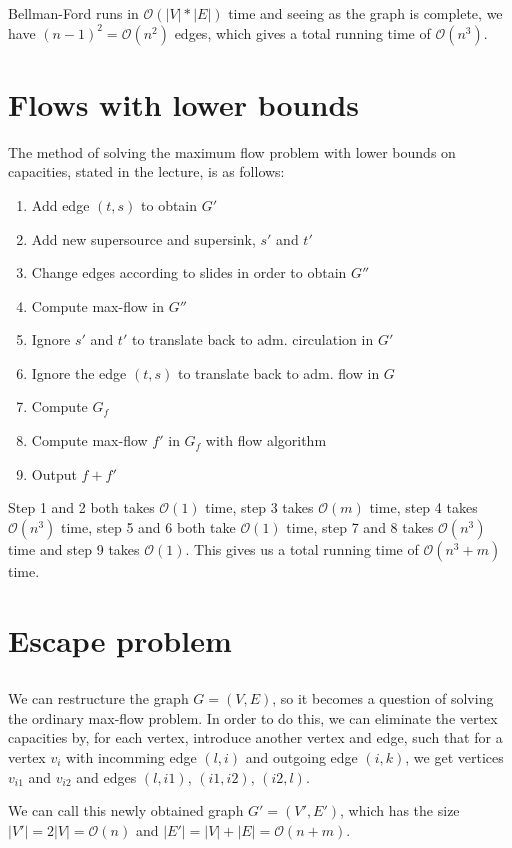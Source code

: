 \documentclass[a4paper]{article}
\begin{document}
Bellman-Ford runs in $\mathcal{O}(|V|*|E|)$ time and seeing as the graph is complete, we have $(n-1)^2=\mathcal{O}(n^2)$ edges, which gives a total running time of $\mathcal{O}(n^3)$.
\section{Flows with lower bounds}
The method of solving the maximum flow problem with lower bounds on capacities, stated in the lecture, is as follows:
\begin{enumerate}
    \item Add edge $(t,s)$ to obtain $G'$
    \item Add new supersource and supersink, $s'$ and $t'$
    \item Change edges according to slides in order to obtain $G''$
    \item Compute max-flow in $G''$
    \item Ignore $s'$ and $t'$ to translate back to adm. circulation in $G'$
    \item Ignore the edge $(t,s)$ to translate back to adm. flow in $G$
    \item Compute $G_f$
    \item Compute max-flow $f'$ in $G_f$ with flow algorithm
    \item Output $f+f'$
\end{enumerate}
Step 1 and 2 both takes $\mathcal{O}(1)$ time, step 3 takes $\mathcal{O}(m)$ time, step 4 takes $\mathcal{O}(n^3)$ time, step 5 and 6 both take $\mathcal{O}(1)$ time, step 7 and 8 takes $\mathcal{O}(n^3)$ time and step 9 takes $\mathcal{O}(1)$. This gives us a total running time of $\mathcal{O}(n^3+m)$ time.
\section{Escape problem}
\subsection{}
We can restructure the graph $G=(V,E)$, so it becomes a question of solving the ordinary max-flow problem. In order to do this, we can eliminate the vertex capacities by, for each vertex, introduce another vertex and edge, such that for a vertex $v_i$ with incomming edge $(l,i)$ and outgoing edge $(i,k)$, we get vertices $v_{i1}$ and $v_{i2}$ and edges $(l,i1)$, $(i1,i2)$, $(i2,l)$.

We can call this newly obtained graph $G'=(V', E')$, which has the size $|V'|=2|V|= \mathcal{O}(n)$ and $|E'|=|V|+|E|=\mathcal{O}(n+m)$.
\end{document}
